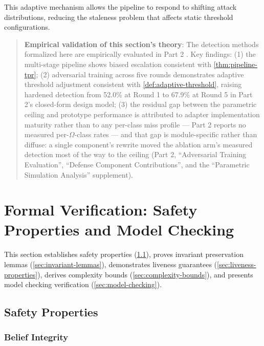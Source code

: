 \documentclass[
]{article}
\begin{document}
This adaptive mechanism allows the pipeline to respond to shifting
attack distributions, reducing the staleness problem that affects static
threshold configurations.

\begin{quote}
\textbf{Empirical validation of this section's theory}: The detection
methods formalized here are empirically evaluated in Part 2
\cite{friedman2026cogsec2}. Key findings: (1) the multi-stage pipeline
shows biased escalation consistent with \cref{thm:pipeline-tpr}; (2)
adversarial training across five rounds demonstrates adaptive threshold
adjustment consistent with \cref{def:adaptive-threshold}, raising
hardened detection from 52.0\% at Round 1 to 67.9\% at Round 5 in Part
2's closed-form design model; (3) the residual gap between the
parametric ceiling and prototype performance is attributed to adapter
implementation maturity rather than to any per-class miss profile ---
Part 2 reports no measured per-\(\Omega\)-class rates --- and that gap
is module-specific rather than diffuse: a single component's rewrite
moved the ablation arm's measured detection most of the way to the
ceiling (Part 2, ``Adversarial Training Evaluation'', ``Defense
Component Contributions'', and the ``Parametric Simulation Analysis''
supplement).
\end{quote}

\newpage

\newpage

\section{Formal Verification: Safety Properties and Model
Checking}\label{sec:formal-verification}

This section establishes safety properties
(\cref{sec:safety-properties}), proves invariant preservation lemmas
(\cref{sec:invariant-lemmas}), demonstrates liveness guarantees
(\cref{sec:liveness-properties}), derives complexity bounds
(\cref{sec:complexity-bounds}), and presents model checking verification
(\cref{sec:model-checking}).

\subsection{Safety Properties}\label{sec:safety-properties}

\subsubsection{Belief Integrity}\label{sec:belief-integrity-proof}
\end{document}
